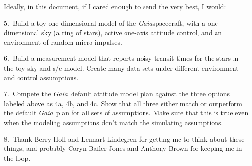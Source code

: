 \documentclass[12pt]{article}
\newcommand{\project}[1]{\textsl{#1}}
\newcommand{\gaia}{\project{Gaia}}
\begin{document}
Ideally, in this document, if I cared enough to send the very best, I
would:

5.~Build a toy one-dimensional model of the \gaia spacecraft, with a
one-dimensional sky (a ring of stars), active one-axis attitude
control, and an environment of random micro-impulses.

6.~Build a measurement model that reports noisy transit times for the
stars in the toy sky and s/c model.  Create many data sets under
different environment and control assumptions.

7.~Compete the \gaia\ default attitude model plan against the three
options labeled above as 4a, 4b, and 4c.  Show that all three either
match or outperform the default \gaia\ plan for all sets of
assumptions.  Make sure that this is true even when the modeling
assumptions don't match the simulating assumptions.

8.~Thank Berry Holl and Lennart Lindegren for getting me to think
about these things, and probably Coryn Bailer-Jones and Anthony Brown
for keeping me in the loop.
\end{document}
